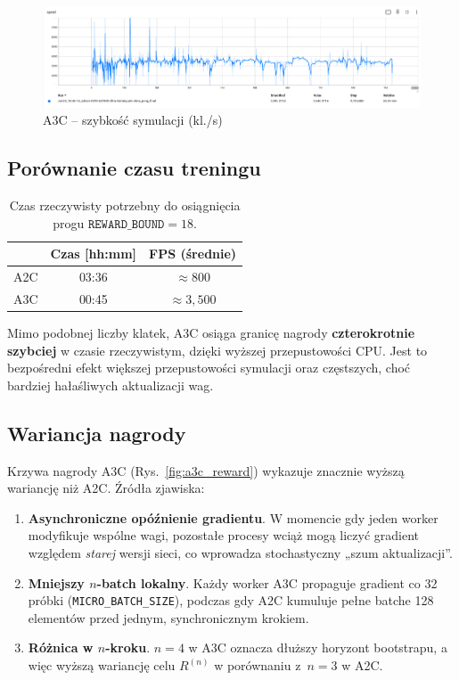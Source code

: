 \documentclass[12pt,a4paper]{article}
\begin{document}
\begin{figure}[H]
  \centering
  \includegraphics[width=.9\linewidth]{images/A3C_speed.png}
  \caption{A3C – szybkość symulacji (kl./s)}
  \label{fig:a3c_speed}
\end{figure}

\subsection{Porównanie czasu treningu}

\begin{table}[H]
  \centering
  \caption{Czas rzeczywisty potrzebny do osiągnięcia progu
           \(\texttt{REWARD\_BOUND}=18\).}
  \label{tab:time_to_bound}
  \begin{tabular}{@{}lcc@{}}
    \toprule
                 & Czas [hh:mm] & FPS (średnie) \\ \midrule
    A2C          & 03:36        &  \(\approx 800\) \\
    A3C          & 00:45        &  \(\approx 3{,}500\) \\ \bottomrule
  \end{tabular}
\end{table}

Mimo podobnej liczby klatek, A3C osiąga granicę nagrody
\textbf{czterokrotnie szybciej} w czasie rzeczywistym, dzięki wyższej przepustowości
CPU.
Jest to bezpośredni efekt większej przepustowości symulacji
oraz częstszych, choć bardziej hałaśliwych aktualizacji wag.

\subsection{Wariancja nagrody}

Krzywa nagrody A3C (Rys.~\ref{fig:a3c_reward})
wykazuje znacznie wyższą wariancję niż A2C.
Źródła zjawiska:

\begin{enumerate}
  \item \textbf{Asynchroniczne opóźnienie gradientu}.  
        W momencie gdy jeden worker modyfikuje wspólne wagi,
        pozostałe procesy wciąż mogą liczyć gradient
        względem \emph{starej} wersji sieci,
        co wprowadza stochastyczny „szum aktualizacji”.
  \item \textbf{Mniejszy $n$-batch lokalny}.  
        Każdy worker A3C propaguje gradient co 32 próbki
        (\texttt{MICRO\_BATCH\_SIZE}), podczas gdy
        A2C kumuluje pełne batche 128 elementów
        przed jednym, synchronicznym krokiem.
  \item \textbf{Różnica w $n$-kroku}.  
        $n=4$ w A3C oznacza dłuższy horyzont bootstrapu,
        a więc wyższą wariancję celu $R^{(n)}$ w porównaniu
        z~$n=3$ w A2C.
\end{enumerate}
\end{document}
